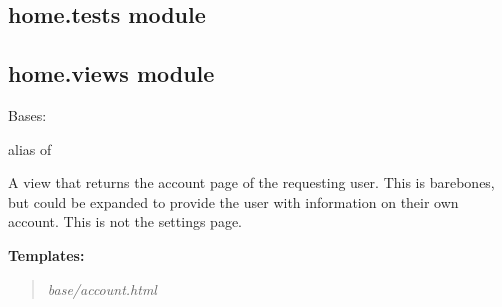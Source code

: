 \documentclass[letterpaper,10pt,english]{sphinxmanual}
\begin{document}
\subsection{home.tests module}
\label{modules/home:module-home.tests}\label{modules/home:home-tests-module}

\subsection{home.views module}
\label{modules/home:home-views-module}\label{modules/home:module-home.views}

\begin{fulllineitems}
\label{modules/home:home.views.UserViewSet}
Bases: 

\begin{fulllineitems}
\label{modules/home:home.views.UserViewSet.queryset}
\end{fulllineitems}


\begin{fulllineitems}
\label{modules/home:home.views.UserViewSet.serializer_class}
alias of 

\end{fulllineitems}


\end{fulllineitems}


\begin{fulllineitems}
\label{modules/home:home.views.account}
A view that returns the account page of the requesting user. This
is barebones, but could be expanded to provide the user with
information on their own account. This is not the settings page.

\textbf{Templates:}
\begin{quote}

\emph{base/account.html}
\end{quote}

\end{fulllineitems}
\end{document}
